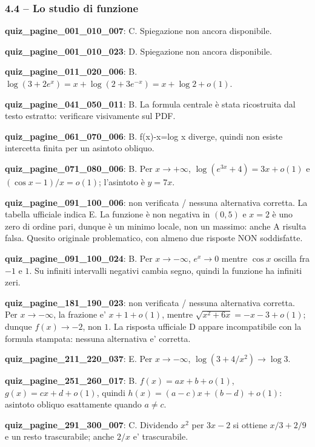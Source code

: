 \documentclass[11pt,a4paper]{article}
\newcounter{quiz}
\begin{document}
\subsubsection*{4.4 -- Lo studio di funzione}
\noindent\textbf{quiz\_pagine\_001\_010\_007}: C. Spiegazione non ancora disponibile.\par\medskip
\noindent\textbf{quiz\_pagine\_001\_010\_023}: D. Spiegazione non ancora disponibile.\par\medskip
\noindent\textbf{quiz\_pagine\_011\_020\_006}: B. $\log(3+2e^x)=x+\log(2+3e^{-x})=x+\log2+o(1)$.\par\medskip
\noindent\textbf{quiz\_pagine\_041\_050\_011}: B. La formula centrale è stata ricostruita dal testo estratto: verificare visivamente sul PDF.\par\medskip
\noindent\textbf{quiz\_pagine\_061\_070\_006}: B. f(x)-x=log x diverge, quindi non esiste intercetta finita per un asintoto obliquo.\par\medskip
\noindent\textbf{quiz\_pagine\_071\_080\_006}: B. Per $x\to+\infty$, $\log(e^{3x}+4)=3x+o(1)$ e $(\cos x-1)/x=o(1)$; l'asintoto è $y=7x$.\par\medskip
\noindent\textbf{quiz\_pagine\_091\_100\_006}: non verificata / nessuna alternativa corretta. La tabella ufficiale indica E. La funzione è non negativa in $(0,5)$ e $x=2$ è uno zero di ordine pari, dunque è un minimo locale, non un massimo: anche A risulta falsa. Quesito originale problematico, con almeno due risposte NON soddisfatte.\par\medskip
\noindent\textbf{quiz\_pagine\_091\_100\_024}: B. Per $x\to-\infty$, $e^x\to0$ mentre $\cos x$ oscilla fra $-1$ e $1$. Su infiniti intervalli negativi cambia segno, quindi la funzione ha infiniti zeri.\par\medskip
\noindent\textbf{quiz\_pagine\_181\_190\_023}: non verificata / nessuna alternativa corretta. Per $x\to-\infty$, la frazione e' $x+1+o(1)$, mentre $\sqrt{x^2+6x}=-x-3+o(1)$; dunque $f(x)\to-2$, non $1$. La risposta ufficiale D appare incompatibile con la formula stampata: nessuna alternativa e' corretta.\par\medskip
\noindent\textbf{quiz\_pagine\_211\_220\_037}: E. Per $x\to-\infty$, $\log(3+4/x^2)\to\log3$.\par\medskip
\noindent\textbf{quiz\_pagine\_251\_260\_017}: B. $f(x)=ax+b+o(1)$, $g(x)=cx+d+o(1)$, quindi $h(x)=(a-c)x+(b-d)+o(1)$: asintoto obliquo esattamente quando $a\ne c$.\par\medskip
\noindent\textbf{quiz\_pagine\_291\_300\_007}: C. Dividendo $x^2$ per $3x-2$ si ottiene $x/3+2/9$ e un resto trascurabile; anche $2/x$ e' trascurabile.\par\medskip
\end{document}
